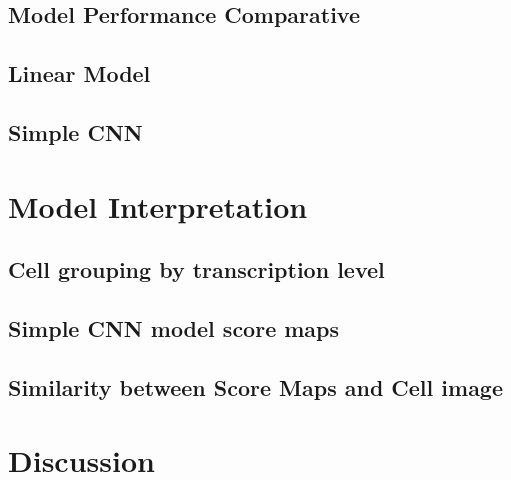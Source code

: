 \documentclass[biblatexBackend=bibtex]{tumthesis}
\begin{document}
\subsection{Model Performance Comparative}
\label{sec:results:comparative}


\subsection{Linear Model}
\label{sec:results:lm}


\subsection{Simple CNN}
\label{sec:results:simple_cnn}


\section{Model Interpretation}
\label{sec:results:model_interpretation}


\subsection{Cell grouping by transcription level}
\label{sec:results:tr_cell_div}


\subsection{Simple CNN model score maps}
\label{sec:results:simple_cnn_sm}


\subsection{Similarity between Score Maps and Cell image}
\label{sec:results:sim_sc_ci}


\section{Discussion}


\newpage
\end{document}
